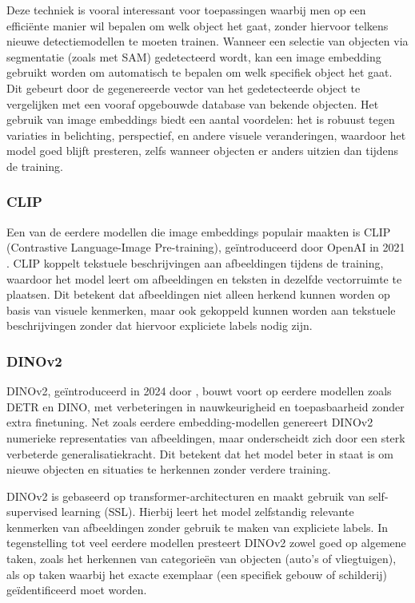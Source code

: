 Deze techniek is vooral interessant voor toepassingen waarbij men op een efficiënte manier wil bepalen om welk object het gaat, zonder hiervoor telkens nieuwe detectiemodellen te moeten trainen. 
Wanneer een selectie van objecten via segmentatie (zoals met SAM) gedetecteerd wordt, kan een image embedding gebruikt worden om automatisch te bepalen om welk specifiek object het gaat. 
Dit gebeurt door de gegenereerde vector van het gedetecteerde object te vergelijken met een vooraf opgebouwde database van bekende objecten. 
Het gebruik van image embeddings biedt een aantal voordelen: het is robuust tegen variaties in belichting, perspectief, en andere visuele veranderingen, waardoor het model goed blijft presteren, zelfs wanneer objecten er anders uitzien dan tijdens de training.

\subsubsection{CLIP}

Een van de eerdere modellen die image embeddings populair maakten is CLIP (Contrastive Language-Image Pre-training), geïntroduceerd door OpenAI in 2021 \autocite{Radford2021}.
CLIP koppelt tekstuele beschrijvingen aan afbeeldingen tijdens de training, waardoor het model leert om afbeeldingen en teksten in dezelfde vectorruimte te plaatsen. 
Dit betekent dat afbeeldingen niet alleen herkend kunnen worden op basis van visuele kenmerken, maar ook gekoppeld kunnen worden aan tekstuele beschrijvingen zonder dat hiervoor expliciete labels nodig zijn.

\subsubsection{DINOv2}

DINOv2, geïntroduceerd in 2024 door \textcite{Oquab2024}, bouwt voort op eerdere modellen zoals DETR en DINO, met verbeteringen in nauwkeurigheid en toepasbaarheid zonder extra finetuning. 
Net zoals eerdere embedding-modellen genereert DINOv2 numerieke representaties van afbeeldingen, maar onderscheidt zich door een sterk verbeterde generalisatiekracht. 
Dit betekent dat het model beter in staat is om nieuwe objecten en situaties te herkennen zonder verdere training.

DINOv2 is gebaseerd op transformer-architecturen en maakt gebruik van self-supervised learning (SSL). 
Hierbij leert het model zelfstandig relevante kenmerken van afbeeldingen zonder gebruik te maken van expliciete labels. 
In tegenstelling tot veel eerdere modellen presteert DINOv2 zowel goed op algemene taken, zoals het herkennen van categorieën van objecten (auto's of vliegtuigen), als op taken waarbij het exacte exemplaar (een specifiek gebouw of schilderij) geïdentificeerd moet worden. 

